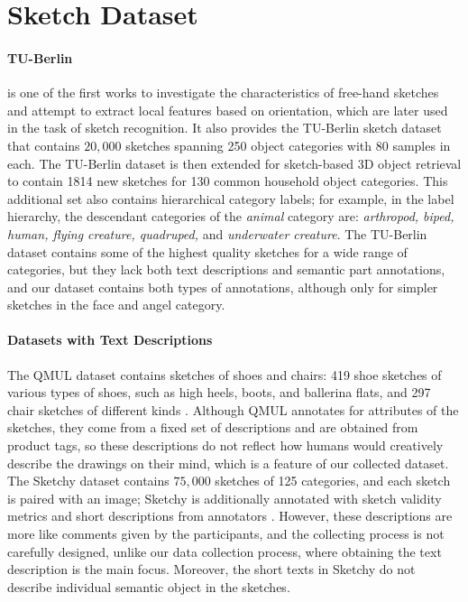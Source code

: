 \section{Sketch Dataset} \label{related.sketch.datasets}

\paragraph{TU-Berlin}
\citet{eitz2012hdhso} is one of the first works to investigate the characteristics of free-hand sketches and attempt to extract local features based on orientation, which are later used in the task of sketch recognition. 
It also provides the TU-Berlin sketch dataset that contains $20,000$ sketches spanning 250 object categories with 80 samples in each. 
The TU-Berlin dataset is then extended for sketch-based 3D object retrieval to contain 1814 new sketches for 130 common household object categories. This additional set also contains hierarchical category labels; for example, in the label hierarchy, the descendant categories of the \textit{animal} category are: \textit{arthropod, biped, human, flying creature, quadruped,} and \textit{underwater creature}. 
The TU-Berlin dataset contains some of the highest quality sketches for a wide range of categories, but they lack both text descriptions and semantic part annotations, and our dataset contains both types of annotations, although only for simpler sketches in the face and angel category.    

\paragraph{Datasets with Text Descriptions}
The QMUL dataset contains sketches of shoes and chairs: 419 shoe sketches of various types of shoes, such as high heels, boots, and ballerina flats, and 297 chair sketches of different kinds \citep{qmulDataset}. 
Although QMUL annotates for attributes of the sketches, they come from a fixed set of descriptions and are obtained from product tags, so these descriptions do not reflect how humans would creatively describe the drawings on their mind, which is a feature of our collected dataset.    
The Sketchy dataset contains $75,000$ sketches of 125 categories, and each sketch is paired with an image; Sketchy is additionally annotated with sketch validity metrics and short descriptions from annotators \citep{sketchyDataset}. However, these descriptions are more like comments given by the participants, and the collecting process is not carefully designed, unlike our data collection process, where obtaining the text description is the main focus. 
Moreover, the short texts in Sketchy do not describe individual semantic object in the sketches.     

